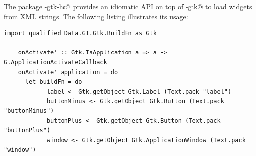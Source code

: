 \documentclass[UdineBachThesis,american,11pt]{PhdThesis}
\begin{document}
  The package \lstinline@gi-gtk-hs@ provides an idiomatic API on top of
  \lstinline@gi-gtk@ to load widgets from XML strings. The following listing
  illustrates its usage:

  \begin{lstlisting}[gobble=4,basicstyle=\ttfamily\small]
    import qualified Data.GI.Gtk.BuildFn as Gtk

    onActivate' :: Gtk.IsApplication a => a -> G.ApplicationActivateCallback
    onActivate' application = do
      let buildFn = do
            label <- Gtk.getObject Gtk.Label (Text.pack "label")
            buttonMinus <- Gtk.getObject Gtk.Button (Text.pack "buttonMinus")
            buttonPlus <- Gtk.getObject Gtk.Button (Text.pack "buttonPlus")
            window <- Gtk.getObject Gtk.ApplicationWindow (Text.pack "window")
  \end{lstlisting}

  \newpage
\end{document}
